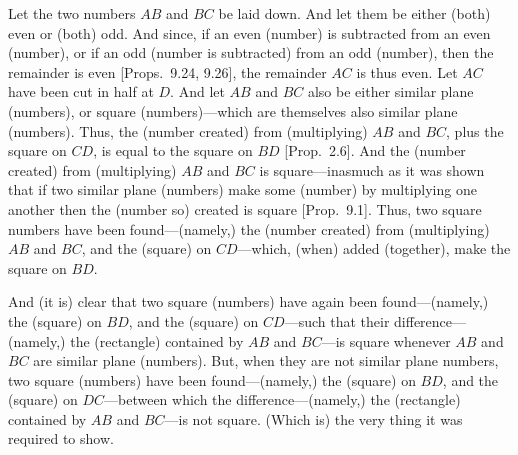 \begin{Parallel}{}{}
{Let the two numbers $AB$ and $BC$ be laid down. And let them
be either (both)  even or (both) odd. And since, if an even (number) is subtracted
from an even (number), or if an odd (number is subtracted) from an odd
(number), then the remainder is even [Props.~9.24, 9.26], the remainder $AC$ is thus even. Let
$AC$ have been cut in half at $D$. And let $AB$ and $BC$ also be
either similar plane (numbers), or square (numbers)---which are themselves
also similar plane (numbers). Thus, the (number created) from (multiplying)  $AB$ and
$BC$, plus the square on $CD$, is equal to the square on $BD$ [Prop.~2.6].  And the (number created) from (multiplying) $AB$ and $BC$ is square---inasmuch as it was shown that
if two similar plane (numbers) make some (number) by multiplying
one another then the (number so) created is square [Prop.~9.1]. Thus, two square numbers have been
found---(namely,) the (number created) from (multiplying) $AB$ and $BC$,
and the (square) on $CD$---which, (when) added (together),
make the square on $BD$.

And (it is) clear that two square (numbers) have again been found---(namely,) the (square) on $BD$, and the (square) on $CD$---such that their difference---(namely,) the (rectangle) contained by $AB$ and $BC$---is  square
whenever $AB$ and $BC$ are similar plane (numbers). But, when they are
not similar plane numbers, two square (numbers) have been found---(namely,) the (square) on $BD$, and the (square) on $DC$---between which the difference---(namely,) the (rectangle) contained by $AB$ and $BC$---is
not  square. (Which is) the very thing it was required to show.}
\end{Parallel}

